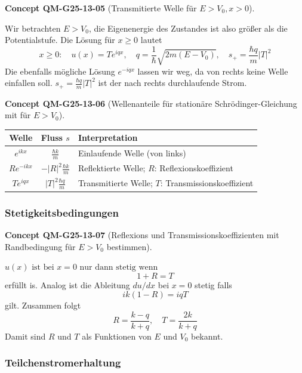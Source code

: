 \documentclass[10pt, letterpaper]{article}
\newcommand{\CustomHeading}[3]{%
  \par\medskip\noindent%
  \textbf{#1 #2} \textnormal{(#3)}.\enskip%
}
\newenvironment{CONC}[2]{\begin{unitbox}\CustomHeading{Concept}{#1}{#2}}{\end{unitbox}}
\begin{document}
\begin{CONC}{QM-G25-13-05}{Transmitierte Welle für $E>V_0, x>0$}
Wir betrachten $E>V_{0}$, die Eigenenergie des Zustandes ist also größer als die Potentialstufe. Die Lösung für $x \geq 0$ lautet
$$
x \geq 0: \quad u(x)=T e^{i q x}, \quad q=\frac{1}{\hbar} \sqrt{2 m\left(E-V_{0}\right)}, \quad s_{+}=\frac{\hbar q}{m}|T|^{2}
$$
Die ebenfalls mögliche Lösung $e^{-i q x}$ lassen wir weg, da von rechts keine Welle einfallen soll. $s_{+}=\frac{\hbar q}{m}|T|^{2}$ ist der nach rechts durchlaufende Strom.
\end{CONC}





\begin{CONC}{QM-G25-13-06}{Wellenanteile für stationäre Schrödinger-Gleichung mit  für $E>V_0$}
\begin{center}
\renewcommand{\arraystretch}{1.3}
\begin{tabular}{|c|c|l|}
\hline
\textbf{Welle} & \textbf{Fluss $s$} & \textbf{Interpretation} \\
\hline
$e^{i k x}$ & $\frac{\hbar k}{m}$ & Einlaufende Welle (von links) \\
$R e^{-i k x}$ & $-|R|^{2} \frac{\hbar k}{m}$ & Reflektierte Welle; $R$: Reflexionskoeffizient \\
$T e^{i q x}$ & $|T|^{2} \frac{\hbar q}{m}$ & Transmitierte Welle; $T$: Transmissionskoeffizient \\
\hline
\end{tabular}
\end{center}
\end{CONC}




\subsubsection*{Stetigkeitsbedingungen}

\begin{CONC}{QM-G25-13-07}{Reflexions und Transmissionskoeffizienten mit Randbedingung für $E>V_0$ bestimmen}
$u(x) \text { ist bei } x=0 \text { nur dann stetig wenn }$
$$
1+R=T
$$
erfüllt is. Analog ist die Ableitung $d u / d x$ bei $x=0$ stetig falls
$$
i k(1-R)=i q T
$$
gilt. Zusammen folgt
$$
R=\frac{k-q}{k+q}, \quad T=\frac{2 k}{k+q}
$$
Damit sind $R$ und $T$ als Funktionen von $E$ und $V_{0}$ bekannt.
\end{CONC}




\subsubsection*{Teilchenstromerhaltung}
\end{document}
